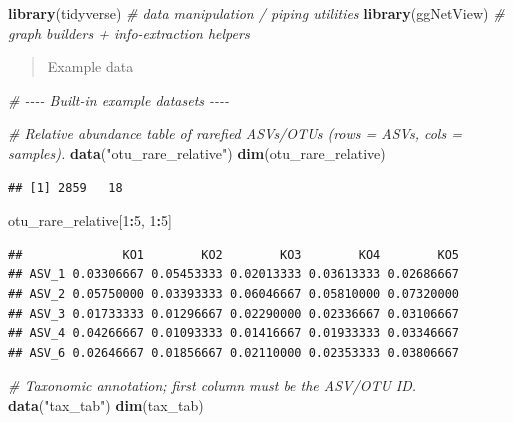 \documentclass[
]{book}
\newenvironment{Shaded}{\begin{snugshade}}{\end{snugshade}}
\newcommand{\CommentTok}[1]{\textcolor[rgb]{0.56,0.35,0.01}{\textit{#1}}}
\newcommand{\DecValTok}[1]{\textcolor[rgb]{0.00,0.00,0.81}{#1}}
\newcommand{\FunctionTok}[1]{\textcolor[rgb]{0.13,0.29,0.53}{\textbf{#1}}}
\newcommand{\NormalTok}[1]{#1}
\newcommand{\SpecialCharTok}[1]{\textcolor[rgb]{0.81,0.36,0.00}{\textbf{#1}}}
\newcommand{\StringTok}[1]{\textcolor[rgb]{0.31,0.60,0.02}{#1}}
\begin{document}
\begin{Shaded}
\begin{Highlighting}[]
\FunctionTok{library}\NormalTok{(tidyverse)   }\CommentTok{\# data manipulation / piping utilities}
\FunctionTok{library}\NormalTok{(ggNetView)   }\CommentTok{\# graph builders + info{-}extraction helpers}
\end{Highlighting}
\end{Shaded}

\begin{quote}
Example data
\end{quote}

\begin{Shaded}
\begin{Highlighting}[]
\CommentTok{\# {-}{-}{-}{-} Built{-}in example datasets {-}{-}{-}{-}}

\CommentTok{\# Relative abundance table of rarefied ASVs/OTUs (rows = ASVs, cols = samples).}
\FunctionTok{data}\NormalTok{(}\StringTok{"otu\_rare\_relative"}\NormalTok{)}
\FunctionTok{dim}\NormalTok{(otu\_rare\_relative)}
\end{Highlighting}
\end{Shaded}

\begin{verbatim}
## [1] 2859   18
\end{verbatim}

\begin{Shaded}
\begin{Highlighting}[]
\NormalTok{otu\_rare\_relative[}\DecValTok{1}\SpecialCharTok{:}\DecValTok{5}\NormalTok{, }\DecValTok{1}\SpecialCharTok{:}\DecValTok{5}\NormalTok{]}
\end{Highlighting}
\end{Shaded}

\begin{verbatim}
##              KO1        KO2        KO3        KO4        KO5
## ASV_1 0.03306667 0.05453333 0.02013333 0.03613333 0.02686667
## ASV_2 0.05750000 0.03393333 0.06046667 0.05810000 0.07320000
## ASV_3 0.01733333 0.01296667 0.02290000 0.02336667 0.03106667
## ASV_4 0.04266667 0.01093333 0.01416667 0.01933333 0.03346667
## ASV_6 0.02646667 0.01856667 0.02110000 0.02353333 0.03806667
\end{verbatim}

\begin{Shaded}
\begin{Highlighting}[]
\CommentTok{\# Taxonomic annotation; first column must be the ASV/OTU ID.}
\FunctionTok{data}\NormalTok{(}\StringTok{"tax\_tab"}\NormalTok{)}
\FunctionTok{dim}\NormalTok{(tax\_tab)}
\end{Highlighting}
\end{Shaded}
\end{document}
